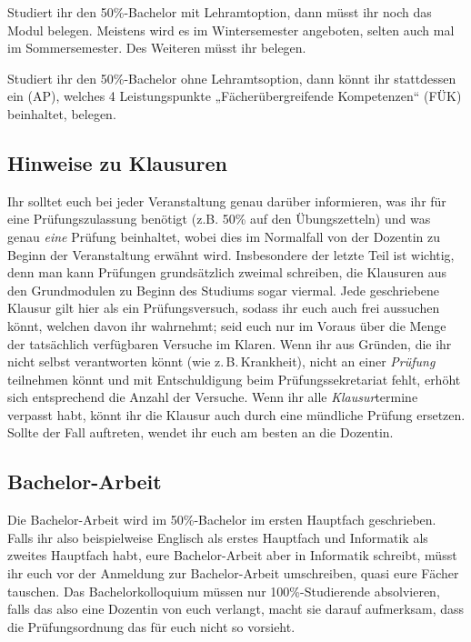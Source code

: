 Studiert ihr den 50\%-Bachelor mit Lehramtoption, dann müsst ihr noch das Modul  belegen. Meistens wird es im Wintersemester angeboten, selten auch mal im Sommersemester. Des Weiteren müsst ihr  belegen.

Studiert ihr den 50\%-Bachelor ohne Lehramtsoption, dann könnt ihr stattdessen ein  (\gls{AP}), welches 4 Leistungspunkte „Fächerübergreifende Kompetenzen“ (FÜK) beinhaltet, belegen.

\vspace{-1mm}

\subsection{Hinweise zu Klausuren}
Ihr solltet euch bei jeder Veranstaltung genau darüber informieren, was ihr für eine Prüfungszulassung benötigt (z.B. 50\% auf den Übungszetteln) und was genau \emph{eine} Prüfung beinhaltet, wobei dies im Normalfall von der Dozentin zu Beginn der Veranstaltung erwähnt wird. Insbesondere der letzte Teil ist wichtig, denn man kann Prüfungen grundsätzlich zweimal schreiben, die Klausuren aus den Grundmodulen zu Beginn des Studiums sogar viermal. Jede geschriebene Klausur gilt hier als ein Prüfungsversuch, sodass ihr euch auch frei aussuchen könnt, welchen davon ihr wahrnehmt; seid euch nur im Voraus über die Menge der tatsächlich verfügbaren Versuche im Klaren. Wenn ihr aus Gründen, die ihr nicht selbst verantworten könnt (wie z.\,B.\,Krankheit), nicht an einer \emph{Prüfung} teilnehmen könnt und mit Entschuldigung beim Prüfungssekretariat fehlt, erhöht sich entsprechend die Anzahl der Versuche. Wenn ihr alle \emph{Klausur}termine verpasst habt, könnt ihr die Klausur auch durch eine mündliche Prüfung ersetzen. Sollte der Fall auftreten, wendet ihr euch am besten an die Dozentin.


\subsection{Bachelor-Arbeit}
Die Bachelor-Arbeit wird im 50\%-Bachelor im ersten Hauptfach geschrieben. Falls ihr also beispielweise Englisch als erstes Hauptfach und Informatik als zweites Hauptfach habt, eure Bachelor-Arbeit aber in Informatik schreibt, müsst ihr euch vor der Anmeldung zur Bachelor-Arbeit umschreiben, quasi eure Fächer tauschen. Das Bachelorkolloquium müssen nur 100\%-Studierende absolvieren, falls das also eine Dozentin von euch verlangt, macht sie darauf aufmerksam, dass die Prüfungsordnung das für euch nicht so vorsieht.

